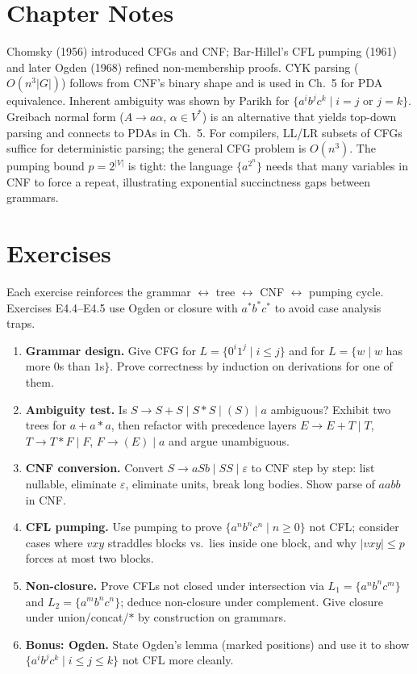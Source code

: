 \section{Chapter Notes}
Chomsky (1956) introduced CFGs and CNF; Bar-Hillel's CFL pumping (1961) and later Ogden (1968) refined non-membership proofs. CYK parsing ($O(n^3|G|)$) follows from CNF's binary shape and is used in Ch.~5 for PDA equivalence. Inherent ambiguity was shown by Parikh for $\{a^ib^jc^k\mid i=j\text{ or }j=k\}$.
Greibach normal form ($A\to a\alpha$, $\alpha\in V^*$) is an alternative that yields top-down parsing and connects to PDAs in Ch.~5.
For compilers, LL/LR subsets of CFGs suffice for deterministic parsing; the general CFG problem is $O(n^3)$.
The pumping bound $p=2^{|V|}$ is tight: the language $\{a^{2^{n}}\}$ needs that many variables in CNF to force a repeat, illustrating exponential succinctness gaps between grammars.

\section{Exercises}
\label{sec:ch04-exercises}
Each exercise reinforces the grammar $\leftrightarrow$ tree $\leftrightarrow$ CNF $\leftrightarrow$ pumping cycle.
Exercises E4.4--E4.5 use Ogden or closure with $a^*b^*c^*$ to avoid case analysis traps.
\begin{enumerate}[label=E4.\arabic*, leftmargin=*, itemsep=0.8em]
\item \textbf{Grammar design.} Give CFG for $L=\{0^i1^j\mid i\le j\}$ and for $L=\{w\mid w$ has more $0$s than $1$s$\}$. Prove correctness by induction on derivations for one of them.
\item \textbf{Ambiguity test.} Is $S\to S+S\mid S*S\mid(S)\mid a$ ambiguous? Exhibit two trees for $a+a*a$, then refactor with precedence layers $E\to E+T\mid T$, $T\to T*F\mid F$, $F\to(E)\mid a$ and argue unambiguous.
\item \textbf{CNF conversion.} Convert $S\to aS b\mid S S\mid\varepsilon$ to CNF step by step: list nullable, eliminate $\varepsilon$, eliminate units, break long bodies. Show parse of $aabb$ in CNF.
\item \textbf{CFL pumping.} Use pumping to prove $\{a^n b^n c^n\mid n\ge0\}$ not CFL; consider cases where $vxy$ straddles blocks vs.\ lies inside one block, and why $|vxy|\le p$ forces at most two blocks.
\item \textbf{Non-closure.} Prove CFLs not closed under intersection via $L_1=\{a^nb^nc^m\}$ and $L_2=\{a^mb^nc^n\}$; deduce non-closure under complement. Give closure under union/concat/$*$ by construction on grammars.
\item \textbf{Bonus: Ogden.} State Ogden's lemma (marked positions) and use it to show $\{a^ib^jc^k\mid i\le j\le k\}$ not CFL more cleanly.
\end{enumerate}
